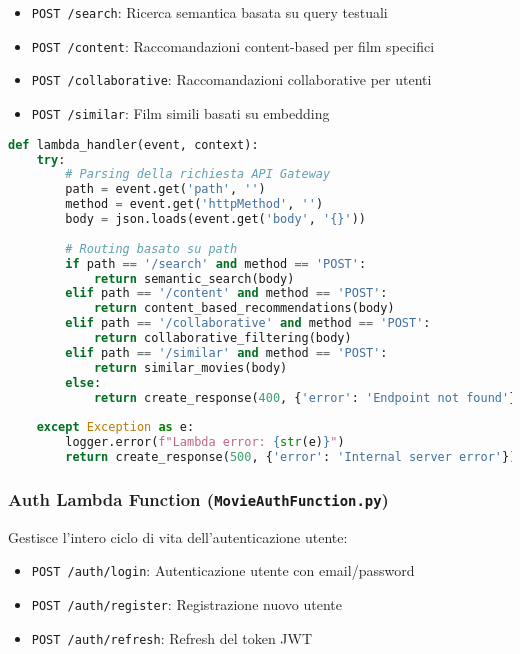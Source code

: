 \documentclass[11pt,a4paper]{article}
\begin{document}
\begin{itemize}
  \item \texttt{POST /search}: Ricerca semantica basata su query testuali
  \item \texttt{POST /content}: Raccomandazioni content-based per film specifici
  \item \texttt{POST /collaborative}: Raccomandazioni collaborative per utenti
  \item \texttt{POST /similar}: Film simili basati su embedding
\end{itemize}

\begin{lstlisting}[language=Python, caption=Struttura Router Search Lambda]
def lambda_handler(event, context):
    try:
        # Parsing della richiesta API Gateway
        path = event.get('path', '')
        method = event.get('httpMethod', '')
        body = json.loads(event.get('body', '{}'))
        
        # Routing basato su path
        if path == '/search' and method == 'POST':
            return semantic_search(body)
        elif path == '/content' and method == 'POST':
            return content_based_recommendations(body)
        elif path == '/collaborative' and method == 'POST':
            return collaborative_filtering(body)
        elif path == '/similar' and method == 'POST':
            return similar_movies(body)
        else:
            return create_response(400, {'error': 'Endpoint not found'})
            
    except Exception as e:
        logger.error(f"Lambda error: {str(e)}")
        return create_response(500, {'error': 'Internal server error'})
\end{lstlisting}

\subsubsection{Auth Lambda Function (\texttt{MovieAuthFunction.py})}
Gestisce l'intero ciclo di vita dell'autenticazione utente:

\begin{itemize}
  \item \texttt{POST /auth/login}: Autenticazione utente con email/password
  \item \texttt{POST /auth/register}: Registrazione nuovo utente
  \item \texttt{POST /auth/refresh}: Refresh del token JWT
\end{itemize}
\end{document}
